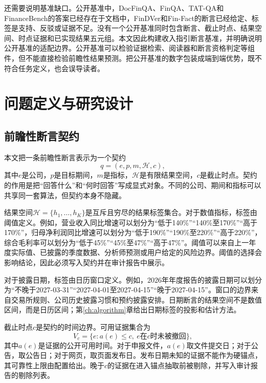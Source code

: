 {\sloppy
还需要说明基准缺口。公开基准中，DocFinQA、FinQA、TAT-QA和FinanceBench的答案已经存在于文档中，FinDVer和Fin-Fact的断言已经给定、标签是支持、反驳或证据不足。没有一个公开基准同时包含断言、截止时点、结果空间、时点证据和已实现结果五元组。本文因此构建收入指引断言基准，并明确说明公开基准的适配边界。公开基准可以检验证据检索、阅读器和断言资格判定等组件，但不能直接检验前瞻性结果预测。把公开基准的数字包装成端到端优势，既不符合任务定义，也会误导读者。\par
}

\chapter{问题定义与研究设计}
\label{ch:problem}

\section{前瞻性断言契约}

本文把一条前瞻性断言表示为一个契约
\begin{equation}
q=(e,p,m,\mathcal H,c),
\label{eq:contract}
\end{equation}
其中$e$是公司，$p$是目标期间，$m$是指标，$\mathcal H$是有限结果空间，$c$是截止时点。契约的作用是把“回答什么”和“何时回答”写成显式对象。不同的公司、期间和指标可以共享同一套算法，但契约本身不隐藏。

结果空间$\mathcal H=\{h_1,\dots,h_K\}$是互斥且穷尽的结果标签集合。对于数值指标，标签由阈值定义。例如，营业收入同比增速可以划分为“低于140\%”“140\%至170\%”“高于170\%”，归母净利润同比增速可以划分为“低于190\%”“190\%至220\%”“高于220\%”，综合毛利率可以划分为“低于45\%”“45\%至47\%”“高于47\%”。阈值可以来自上一年度实际值、已披露的季度数据、分析师预测或用户给定的风险边界。阈值的选择会影响结论，因此必须写入契约并在审计报告中展示。

对于披露日期，标签由日历窗口定义。例如，2026年年度报告的披露日期可以划分为“不晚于2027-03-31”“2027-04-01至2027-04-15”“晚于2027-04-15”。窗口的边界来自交易所规则、公司历史披露习惯和预约披露安排。日期断言的结果空间不是数值区间，而是日历区间；第\ref{ch:algorithm}章给出日期标签的投影和估计方法。

截止时点$c$是契约的时间边界。可用证据集合为
\begin{equation}
V_c=\{e:a(e)\le c,\ e\text{在}c\text{时未被撤回}\},
\label{eq:cutoff}
\end{equation}
其中$a(e)$是证据的公开可用时间。对于申报文件，$a(e)$取文件提交日；对于公告，取公告日；对于网页，取页面发布日。发布日期未知的证据不能作为硬锚点，其可靠性上限由配置给出。晚于$c$的证据在进入锚点抽取前被剔除，并写入审计报告的剔除列表。

